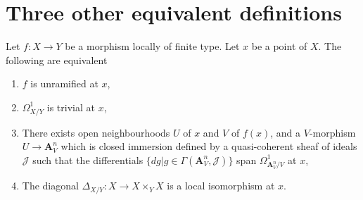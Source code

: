 \section{Three other equivalent definitions}
\label{section-three-other}

\begin{theorem}
\label{theorem-unramified-equivalence}
Let $f:X \to Y$ be a morphism locally of finite type. Let $x$ be a point of
$X$. The following are equivalent
\begin{enumerate}
\item $f$ is unramified at $x$,
\item $\Omega^1_{X/Y}$ is trivial at $x$,
\item There exists open neighbourhoods $U$ of $x$ and $V$ of $f(x)$, and a
$V$-morphism $U \to \mathbf{A}^n_V$ which is closed immersion defined by a
quasi-coherent sheaf of ideals $\mathcal{J}$ such that the differentials
$\{dg | g \in \Gamma(\mathbf{A}^n_V,\mathcal{J})\}$ span 
$\Omega^1_{\mathbf{A}^n_V/V}$ at $x$,
\item The diagonal $\Delta_{X/Y}:X \to X \times_Y X$ is a local isomorphism at
$x$.
\end{enumerate}
\end{theorem}

